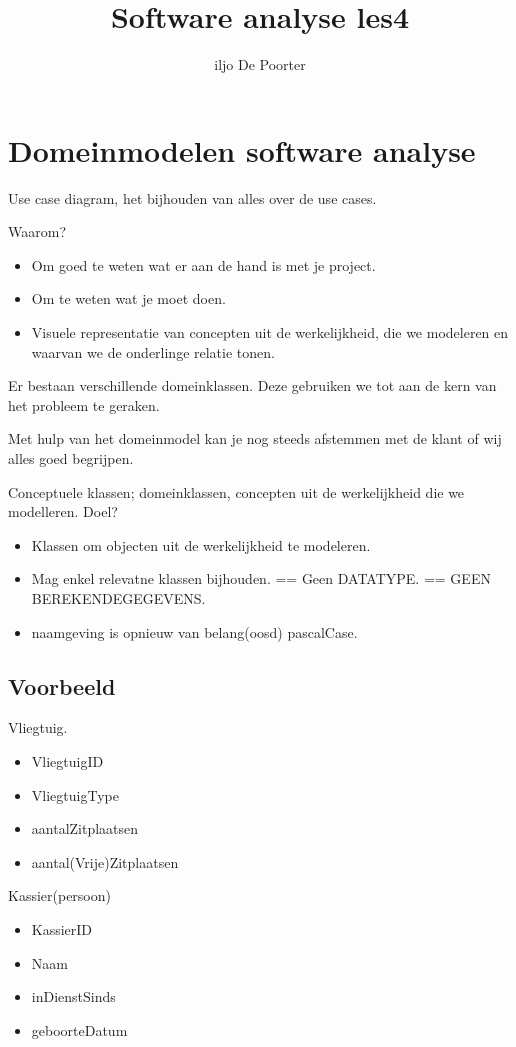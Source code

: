 \documentclass{article}
\author{iljo De Poorter}
\title{Software analyse les4}
\begin{document}
\maketitle
\section{Domeinmodelen software analyse}
Use case diagram, het bijhouden van alles over de use cases.

Waarom?
\begin{itemize}
\item Om goed te weten wat er aan de hand is met je project.
\item Om te weten wat je moet doen.
\item Visuele representatie van concepten uit de werkelijkheid, die we modeleren en waarvan we de onderlinge relatie tonen.
\end{itemize}
Er bestaan verschillende domeinklassen. Deze gebruiken we tot aan de kern van het probleem te geraken. 

Met hulp van het domeinmodel kan je nog steeds afstemmen met de klant of wij alles goed begrijpen.


Conceptuele klassen; domeinklassen, concepten uit de werkelijkheid die we modelleren.
Doel?
\begin{itemize}
\item Klassen om objecten uit de werkelijkheid te modeleren.
\item Mag enkel relevatne klassen bijhouden. == Geen DATATYPE. == GEEN BEREKENDEGEGEVENS.
\item naamgeving is opnieuw van belang(oosd) pascalCase.
\end{itemize}

\subsection{Voorbeeld}
Vliegtuig.
\begin{itemize}
\item VliegtuigID
\item VliegtuigType
\item aantalZitplaatsen
\item aantal(Vrije)Zitplaatsen
\end{itemize}


Kassier(persoon)
\begin{itemize}
\item KassierID
\item Naam
\item inDienstSinds
\item geboorteDatum
\end{itemize}
\end{document}

